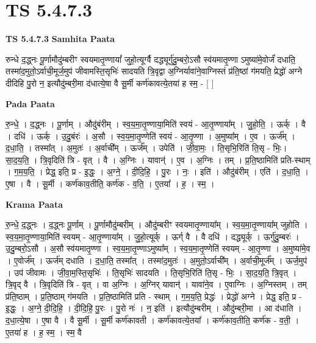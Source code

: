 \documentclass[17pt]{extarticle}
\begin{document}
\section{ TS 5.4.7.3 }

\textbf{TS 5.4.7.3 } \newline
\textbf{Samhita Paata} \newline

रुन्धे द॒द्ध्नः पू॒र्णामौदु॑म्बरीꣳ स्वयमातृ॒ण्णायां᳚ जुहो॒त्यूर्ग्वै दद्ध्यूर्गु॑दु॒म्बरो॒ऽसौ स्व॑यमातृ॒ण्णा ऽमुष्या॑मे॒वोर्जं॑ दधाति॒ तस्मा॑द॒मुतो॒ऽर्वाची॒मूर्ज॒मुप॑ जीवामस्ति॒सृभिः॑ सादयति त्रि॒वृद्वा अ॒ग्निर्यावा॑ने॒वाग्निस्तं प्र॑ति॒ष्ठां ग॑मयति॒ प्रेद्धो॑ अग्ने दीदिहि पु॒रो न॒ इत्यौदु॑म्बरी॒मा द॑धात्ये॒षा वै सू॒र्मी कर्ण॑कावत्ये॒तया॑ ह स्म॒ - [  ] \newline

\textbf{Pada Paata} \newline

रु॒न्धे॒ । द॒द्ध्नः । पू॒र्णाम् । औदु॑बंरीम् । स्व॒य॒मा॒तृ॒ण्णाया॒मिति॑ स्वयं - आ॒तृ॒ण्णाया᳚म् । जु॒हो॒ति॒ । ऊर्क् । वै । दधि॑ । ऊर्क् । उ॒दु॒बंरः॑ । अ॒सौ । स्व॒य॒मा॒तृ॒ण्णेति॑ स्वयं - आ॒तृ॒ण्णा । अ॒मुष्या᳚म् । ए॒व । ऊर्ज᳚म् । द॒धा॒ति॒ । तस्मा᳚त् । अ॒मुतः॑ । अ॒र्वाची᳚म् । ऊर्ज᳚म् । उपेति॑ । जी॒वा॒मः॒ । ति॒सृभि॒रिति॑ ति॒सृ - भिः॒। सा॒द॒य॒ति॒ । त्रि॒वृदिति॑ त्रि - वृत् । वै । अ॒ग्निः । यावान्॑ । ए॒व । अ॒ग्निः । तम् । प्र॒ति॒ष्ठामिति॑ प्रति-स्थाम् । ग॒म॒य॒ति॒ । प्रेद्ध॒ इति॒ प्र - इ॒द्धः॒ । अ॒ग्ने॒ । दी॒दि॒हि॒ । पु॒रः । नः॒ । इति॑ । औदु॑बंरीम् । एति॑ । द॒धा॒ति॒ । ए॒षा । वै । सू॒र्मी । कर्ण॑काव॒तीति॒ कर्ण॑क - व॒ति॒ । ए॒तया᳚ । ह॒ । स्म॒ ।  \newline


\textbf{Krama Paata} \newline

रु॒न्धे॒ द॒द्ध्नः । द॒द्ध्नः पू॒र्णाम् । पू॒र्णामौदु॑म्बरीम् । औदु॑म्बरीꣳ स्वयमातृ॒ण्णाया᳚म् । स्व॒य॒मा॒तृ॒ण्णाया᳚म् जुहोति । स्व॒य॒मा॒तृ॒ण्णाया॒मिति॑ स्वयम् - आ॒तृ॒ण्णाया᳚म् । जु॒हो॒त्यूर्क् । ऊर्ग् वै । वै दधि॑ । दद्ध्यूर्क् । ऊर्गु॑दु॒म्बरः॑ । उ॒दु॒म्बरो॒ऽसौ । अ॒सौ स्व॑यमातृ॒ण्णा । स्व॒य॒मा॒तृ॒ण्णाऽमुष्या᳚म् । स्व॒य॒मा॒तृ॒ण्णेति॑ स्वयम् - आ॒तृ॒ण्णा । अ॒मुष्या॑मे॒व । ए॒वोर्ज᳚म् । ऊर्ज॑म् दधाति । द॒धा॒ति॒ तस्मा᳚त् । तस्मा॑द॒मुतः॑ । अ॒मुतो॒ऽर्वाची᳚म् । अ॒र्वाची॒मूर्ज᳚म् । ऊर्ज॒मुप॑ । उप॑ जीवामः । जी॒वा॒म॒स्ति॒सृभिः॑ । ति॒सृभिः॑ सादयति । ति॒सृभि॒रिति॑ ति॒सृ - भिः॒ । सा॒द॒य॒ति॒ त्रि॒वृत् । त्रि॒वृद् वै । त्रि॒वृदिति॑ त्रि - वृत् । वा अ॒ग्निः । अ॒ग्निर् यावान्॑ । यावा॑ने॒व । ए॒वाग्निः । अ॒ग्निस्तम् । तम् प्र॑ति॒ष्ठाम् । प्र॒ति॒ष्ठाम् ग॑मयति । प्र॒ति॒ष्ठामिति॑ प्रति - स्थाम् । ग॒म॒य॒ति॒ प्रेद्धः॑ । प्रेद्धो॑ अग्ने । प्रेद्ध॒ इति॒ प्र - इ॒द्धः॒ । अ॒ग्ने॒ दी॒दि॒हि॒ । दी॒दि॒हि॒ पु॒रः । पु॒रो नः॑ । न॒ इति॑ । इत्यौदु॑म्बरीम् । औदु॑म्बरी॒मा । आ द॑धाति । द॒धा॒त्ये॒षा । ए॒षा वै । वै सू॒र्मी । सू॒र्मी कर्ण॑कावती । कर्ण॑कावत्ये॒तया᳚ । कर्ण॑काव॒तीति॒ कर्ण॑क - व॒ती॒ । ए॒तया॑ ह । ह॒ स्म॒ । स्म॒ वै \newline
\end{document}
